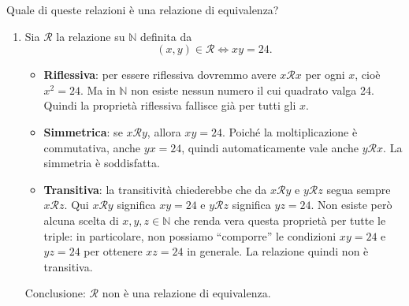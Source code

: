 \begin{esempio}
Quale di queste relazioni è una relazione di equivalenza?

\begin{enumerate}
\item Sia \(\mathcal{R}\) la relazione su \(\mathbb{N}\) definita da
\[
(x,y)\in\mathcal{R} \iff xy = 24.
\]
\begin{itemize}
    \item \textbf{Riflessiva}: per essere riflessiva dovremmo avere \(x\mathcal{R}x\) per ogni \(x\), cioè \(x^2=24\).
          Ma in \(\mathbb{N}\) non esiste nessun numero il cui quadrato valga 24. Quindi la proprietà
          riflessiva fallisce già per tutti gli \(x\).
    \item \textbf{Simmetrica}: se \(x\mathcal{R}y\), allora \(xy=24\). Poiché la moltiplicazione è commutativa,
          anche \(yx=24\), quindi automaticamente vale anche \(y\mathcal{R}x\). La simmetria è soddisfatta.
    \item \textbf{Transitiva}: la transitività chiederebbe che da \(x\mathcal{R}y\) e \(y\mathcal{R}z\) segua sempre
          \(x\mathcal{R}z\). Qui \(x\mathcal{R}y\) significa \(xy=24\) e \(y\mathcal{R}z\) significa \(yz=24\).
          Non esiste però alcuna scelta di \(x,y,z\in\mathbb{N}\) che renda vera questa proprietà per tutte
          le triple: in particolare, non possiamo “comporre” le condizioni \(xy=24\) e \(yz=24\) per ottenere
          \(xz=24\) in generale. La relazione quindi non è transitiva.
\end{itemize}
Conclusione: \(\mathcal{R}\) non è una relazione di equivalenza.


\end{enumerate}
\end{esempio}
